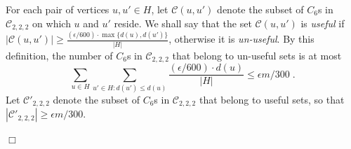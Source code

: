 \documentclass{article}
\newcommand{\eps}{\epsilon}
\newcommand{\calC}{{\mathcal{C}}}
\newenvironment{proof}{\smallskip\noindent{\bf Proof:}}%
        {\hspace*{\fill}$\Box$\par}
\newcommand{\commentt}[1]{ {}}
\begin{document}
\begin{proof}
For each pair of vertices $u,u' \in H$, let $\calC(u,u')$ denote the subset of $C_6$s in $\calC_{2,2,2}$ on which $u$ and $u'$ reside. 
We shall say that the set $\calC(u,u')$ is \emph{useful} if 
$|\calC(u,u')| \geq \frac{(\eps/600)\cdot \max\{d(u),d(u')\}}{|H|}$, otherwise it is \emph{un-useful}.
By this definition, the number of  $C_6$s 
in $\calC_{2,2,2}$ that belong to un-useful sets is at most 
\begin{equation}
    \sum_{u\in H}\sum_{u'\in H:d(u')\leq d(u)}\frac{(\eps/600)\cdot d(u)}{|H|}\leq 
    \eps m/300 \;.
\end{equation}
Let $\calC'_{2,2,2}$ denote the subset of $C_6$s in $\calC_{2,2,2}$ that belong to useful sets, so that
$|\calC'_{2,2,2}| \geq \eps m/300$.


\end{proof}
\end{document}
